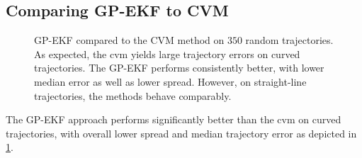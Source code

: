 \subsection{Comparing GP-EKF to CVM}
\begin{figure}[h]
    \centering
    \caption{GP-EKF compared to the CVM method on $350$ random trajectories. As expected, the \acrshort{cvm} yields large trajectory errors on curved trajectories. The GP-EKF performs consistently better, with lower median error as well as lower spread. However, on straight-line trajectories, the methods behave comparably.}
    \label{fig:stats_curved_gp_ekf_cvm}
\end{figure}
The GP-EKF approach performs significantly better than the \acrshort{cvm} on curved trajectories, with overall lower spread and median trajectory error as depicted in \cref{fig:stats_curved_gp_ekf_cvm}.

